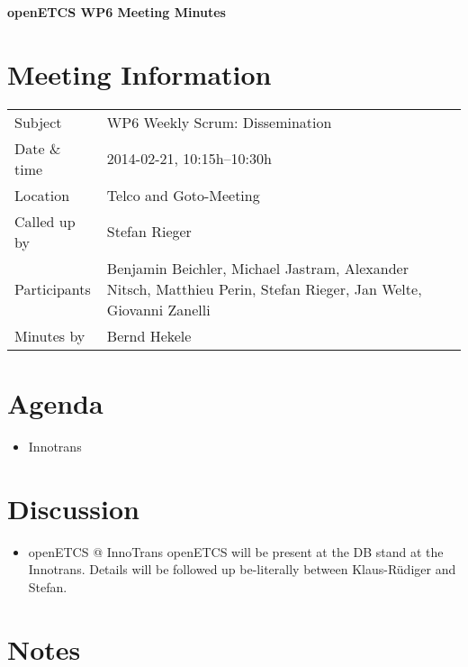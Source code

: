 \documentclass[a4paper, 11pt]{article}
\begin{document}
{\begin{center}\huge\bf openETCS WP6 Meeting Minutes\end{center}}
\section{Meeting Information}

\renewcommand{\arraystretch}{1.5}
\begin{supertabular}{m{.2\textwidth}m{.8\textwidth}}
Subject & WP6 Weekly Scrum: Dissemination\\
Date \& time & 2014-02-21, 10:15h--10:30h\\
Location & Telco and Goto-Meeting\\
Called up by & Stefan Rieger\\
Participants &
Benjamin Beichler,
Michael Jastram,
Alexander Nitsch,
Matthieu Perin,
Stefan Rieger,
Jan Welte,
Giovanni Zanelli
\\

Minutes by & Bernd Hekele\\

\end{supertabular}
\renewcommand{\arraystretch}{1.0}


\section{Agenda}
\begin{itemize}

\item Innotrans

\end{itemize}

\section{Discussion}

\begin{itemize}

\item openETCS @ InnoTrans
openETCS will be present at the DB stand at the Innotrans. Details will be followed up be-literally between Klaus-R\"udiger and Stefan.

\end{itemize}

\section{Notes}
\end{document}
